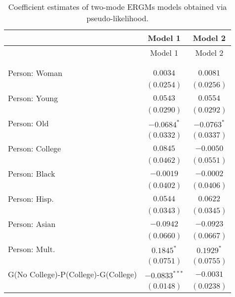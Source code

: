 
\begin{center}
\begin{longtable}{l c c}
\toprule
 & Model 1 & Model 2 \\
\midrule
\endfirsthead
\toprule
 & Model 1 & Model 2 \\
\midrule
\endhead
\bottomrule
\endfoot
\bottomrule
\multicolumn{3}{l}{\scriptsize{$^{***}p<0.001$; $^{**}p<0.01$; $^{*}p<0.05$}}\\
\caption{Coefficient estimates of two-mode ERGMs models obtained via pseudo-likelihood.}
\label{tab:reg3}
\endlastfoot \\
Person: Woman                       & $0.0034$        & $0.0081$        \\
                                    & $(0.0254)$      & $(0.0256)$      \\
Person: Young                       & $0.0543$        & $0.0554$        \\
                                    & $(0.0290)$      & $(0.0292)$      \\
Person: Old                         & $-0.0684^{*}$   & $-0.0763^{*}$   \\
                                    & $(0.0332)$      & $(0.0337)$      \\
Person: College                     & $0.0845$        & $-0.0050$       \\
                                    & $(0.0462)$      & $(0.0551)$      \\
Person: Black                       & $-0.0019$       & $-0.0002$       \\
                                    & $(0.0402)$      & $(0.0406)$      \\
Person: Hisp.                       & $0.0544$        & $0.0622$        \\
                                    & $(0.0343)$      & $(0.0345)$      \\
Person: Asian                       & $-0.0942$       & $-0.0923$       \\
                                    & $(0.0660)$      & $(0.0667)$      \\
Person: Mult.                       & $0.1845^{*}$    & $0.1929^{*}$    \\
                                    & $(0.0751)$      & $(0.0755)$      \\
G(No College)-P(College)-G(College) & $-0.0833^{***}$ & $-0.0031$       \\
                                    & $(0.0148)$      & $(0.0238)$      \\

\end{longtable}
\end{center}
